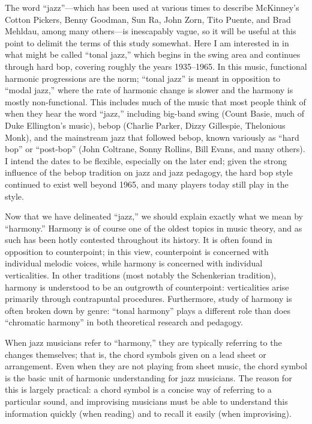 The word “jazz”---which has been used at various times to describe McKinney’s
Cotton Pickers, Benny Goodman, Sun Ra, John Zorn, Tito Puente, and Brad
Mehldau, among many others---is inescapably vague, so it will be useful at
this point to delimit the terms of this study somewhat. Here I am interested
in in what might be called “tonal jazz,” which begins in the swing area and
continues through hard bop, covering roughly the years 1935--1965. In this
music, functional harmonic progressions are the norm; “tonal jazz” is
meant in opposition to “modal jazz,” where the rate of harmonic change is
slower and the harmony is mostly non-functional. This includes much
of the music that most people think of when they hear the word “jazz,”
including big-band swing (Count Basie, much of Duke Ellington’s music), bebop
(Charlie Parker, Dizzy Gillespie, Thelonious Monk), and the mainstream jazz
that followed bebop, known variously as “hard bop” or “post-bop” (John
Coltrane, Sonny Rollins, Bill Evans, and many others). I intend the dates to
be flexible, especially on the later end; given the strong influence of the
bebop tradition on jazz and jazz pedagogy, the hard bop style continued to
exist well beyond 1965, and many players today still play in the
style.

Now that we have delineated “jazz,” we should explain exactly what we mean by
“harmony.” Harmony is of course one of the oldest topics in music theory, and
as such has been hotly contested throughout its history. It is often
found in opposition to counterpoint; in this view, counterpoint is concerned
with individual melodic voices, while harmony is concerned with individual
verticalities. In other traditions (most notably the Schenkerian tradition),
harmony is understood to be an outgrowth of counterpoint: verticalities arise
primarily through contrapuntal procedures. Furthermore, study of harmony is
often broken down by genre: “tonal harmony” plays a different role than does
“chromatic harmony” in both theoretical research and pedagogy.

When jazz musicians refer to “harmony,” they are typically referring to the
changes themselves; that is, the chord symbols given on a lead sheet or
arrangement. Even when they are not playing from sheet music, the chord symbol
is the basic unit of harmonic understanding for jazz musicians. The reason for
this is largely practical: a chord symbol is a concise way of referring to a
particular sound, and improvising musicians must be able to understand this
information quickly (when reading) and to recall it easily (when improvising).

